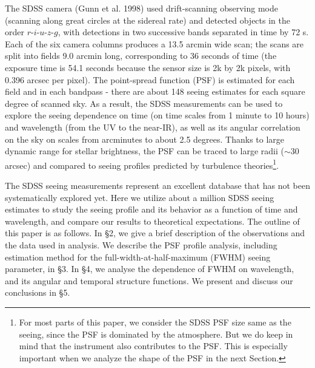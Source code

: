 The SDSS camera (Gunn et al. 1998) used drift-scanning observing mode (scanning along great circles
at the sidereal rate) and detected objects in the order 
$r$-$i$-$u$-$z$-$g$, with detections in two successive bands separated in time by 72 s. Each of the six camera
columns produces a 13.5 arcmin wide scan; the scans are split into fields 9.0 arcmin long, corresponding
to 36 seconds of time (the exposure time is 54.1 seconds because the sensor size is 2k by 2k pixels,
with 0.396 arcsec per pixel). 
The point-spread function (PSF) is estimated for each field and in each bandpass - there are about 
148 seeing estimates for each square degree of scanned sky. As a result, the SDSS measurements can
be used to explore the seeing dependence on time (on time scales from 1 minute to 10 hours) and 
wavelength (from the UV to the near-IR), as well as its angular correlation on the sky on scales from 
arcminutes to about 2.5 degrees. Thanks to large dynamic range for stellar brightness, the PSF can 
be traced to large radii ($\sim$30 arcsec) and compared to seeing profiles predicted by turbulence
theories\footnote{For most parts of this paper, we consider the SDSS PSF size
same as the seeing, since the PSF is dominated by the atmosphere. But we do
keep in mind that the instrument also contributes to the PSF. This is
especially important when we analyze the shape of the PSF in the next Section.}.

The SDSS seeing measurements represent an excellent database that has not been systematically 
explored yet. Here we utilize about a million SDSS seeing estimates to study the seeing profile 
and its behavior as a function of time and wavelength, and compare our results to theoretical 
expectations. The outline of this paper is as follows. In \S2, we give a brief description of the 
observations and the data used in analysis. We describe the PSF profile analysis, 
including estimation method for the full-width-at-half-maximum (FWHM) seeing
parameter, in \S3. In \S4, we analyse the dependence of FWHM on wavelength, and its angular 
and temporal structure functions. We present and discuss our conclusions in \S5. 